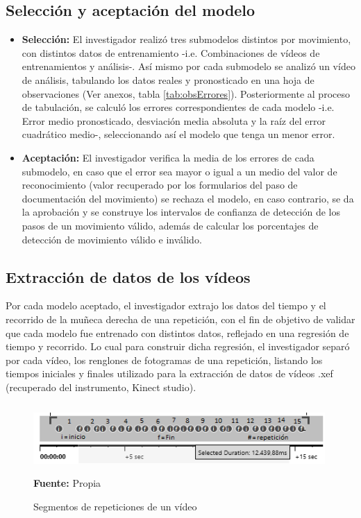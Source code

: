 \subsection{Selecci\'on y aceptaci\'on del modelo}
\begin{itemize}
\item \textbf{Selecci\'on:} El investigador realiz\'o tres submodelos distintos por movimiento, con distintos datos de entrenamiento -i.e. Combinaciones de v\'ideos de entrenamientos y an\'alisis-. As\'i mismo por cada submodelo se analiz\'o un v\'ideo de an\'alisis, tabulando los datos reales y pronosticado en una hoja de observaciones (Ver anexos, tabla \ref{tab:obsErrores}). Posteriormente al proceso de tabulaci\'on, se calcul\'o los errores correspondientes de cada modelo -i.e. Error medio pronosticado, desviaci\'on media absoluta y la ra\'iz del error cuadr\'atico medio-, seleccionando as\'i el modelo que tenga un menor error. 
\item \textbf{Aceptaci\'on:} El investigador  verifica la media de los errores de cada submodelo, en caso que el error sea mayor o igual  a un medio del valor de reconocimiento (valor recuperado por los formularios del paso de documentaci\'on del movimiento) se rechaza el modelo, en caso contrario, se da la aprobaci\'on y se construye los intervalos de confianza de detecci\'on de los pasos de un movimiento v\'alido, adem\'as de calcular los porcentajes de detecci\'on de movimiento v\'alido e inv\'alido.
\end{itemize}
\subsection{Extracci\'on de datos de los v\'ideos}
Por cada modelo aceptado, el investigador extrajo los datos del tiempo y el recorrido de la mu\~neca derecha de una repetici\'on, con el fin de objetivo de validar que cada modelo fue entrenado con distintos datos, reflejado en una  regresi\'on de tiempo y recorrido. Lo cual para construir dicha regresi\'on, el investigador separ\'o por cada v\'ideo, los renglones de fotogramas de una repetici\'on, listando los tiempos iniciales y finales utilizado para la extracci\'on de datos de v\'ideos .xef (recuperado del instrumento, Kinect studio).
\begin{figure}[H]
	\caption{Segmentos de repeticiones de un v\'ideo}
	\label{fig:segVideo}
	\centering
	\includegraphics[width=420px,height=100px]{graphics/separarPuntos.PNG} \\
	\textbf{Fuente:} Propia
\end{figure} 
